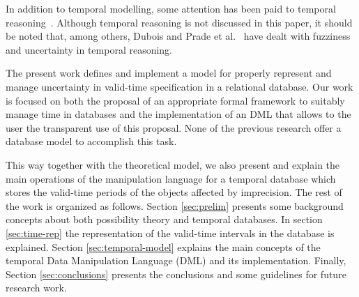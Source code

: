 
In addition to temporal modelling, some attention has been paid to temporal reasoning~\cite{Allen1983}. Although temporal reasoning is not discussed in this paper, it should be noted that, among others, Dubois and Prade et al.~\cite{Dubois2003,DuBois1989} have dealt with fuzziness and uncertainty in temporal reasoning.

The present work defines and implement a model for properly represent and manage uncertainty in valid-time specification in a relational database. Our work is focused on both the proposal of an appropriate formal framework to suitably manage time in databases and the implementation of an DML that allows to the user the transparent use of this proposal. None of the previous research offer a database model to accomplish this task.

This way together with the theoretical model, we also present and explain the main operations of the manipulation language for a temporal database which stores the valid-time periods of the objects affected by imprecision. The rest of the work is organized as follows. Section \ref{sec:prelim} presents some background concepts about both possibility theory and temporal databases. In section \ref{sec:time-rep} the representation of the valid-time intervals in the database is explained. Section \ref{sec:temporal-model} explains the main concepts of the temporal Data Manipulation Language (DML) and its implementation. Finally, Section \ref{sec:conclusions} presents the conclusions and some guidelines for future research work.


